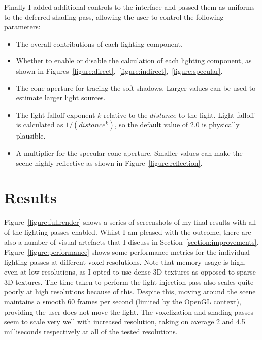 \documentclass[]{acmsiggraph}
\begin{document}
Finally I added additional controls to the interface and passed them as uniforms to the deferred shading pass, allowing the user to control the following parameters:
\begin{itemize}
	\item The overall contributions of each lighting component.
	\item Whether to enable or disable the calculation of each lighting component, as shown in Figures~\ref{figure:direct},~\ref{figure:indirect},~\ref{figure:specular}.
	\item The cone aperture for tracing the soft shadows. Larger values can be used to estimate larger light sources.
	\item The light falloff exponent $k$ relative to the $distance$ to the light. Light falloff is calculated as $1 / (distance^k)$, so the default value of 2.0 is physically plausible.
	\item A multiplier for the specular cone aperture. Smaller values can make the scene highly reflective as shown in Figure~\ref{figure:reflection}.
\end{itemize}

\section{Results}

Figure~\ref{figure:fullrender} shows a series of screenshots of my final results with all of the lighting passes enabled. Whilst I am pleased with the outcome, there are also a number of visual artefacts that I discuss in Section~\ref{section:improvements}. Figure~\ref{figure:performance} shows some performance metrics for the individual lighting passes at different voxel resolutions. Note that memory usage is high, even at low resolutions, as I opted to use dense 3D textures as opposed to sparse 3D textures. The time taken to perform the light injection pass also scales quite poorly at high resolutions because of this. Despite this, moving around the scene maintains a smooth 60 frames per second (limited by the OpenGL context), providing the user does not move the light. The voxelization and shading passes seem to scale very well with increased resolution, taking on average 2 and 4.5 milliseconds respectively at all of the tested resolutions.
\end{document}
